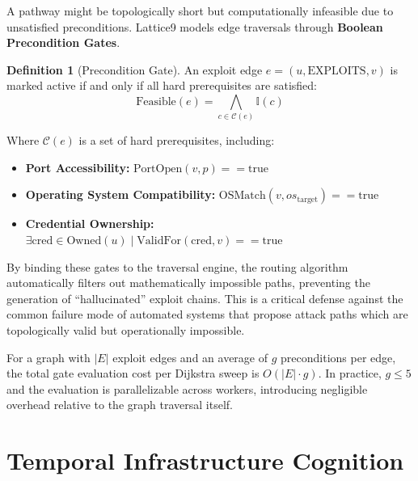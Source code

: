 \documentclass[11pt,a4paper]{article}
\theoremstyle{definition}
\newtheorem{definition}{Definition}[section]
\numberwithin{equation}{section}
\newcommand{\set}[1]{\mathcal{#1}}
\newcommand{\ind}[1]{\mathbb{I}(#1)}
\begin{document}
A pathway might be topologically short but computationally infeasible due to unsatisfied preconditions. Lattice9 models edge traversals through \textbf{Boolean Precondition Gates}.

\begin{definition}[Precondition Gate]
An exploit edge $e = (u, \text{EXPLOITS}, v)$ is marked active if and only if all hard prerequisites are satisfied:
\begin{equation}\label{eq:feasibility}
\text{Feasible}(e) = \bigwedge_{c \in \set{C}(e)} \ind{c}
\end{equation}
\end{definition}

Where $\set{C}(e)$ is a set of hard prerequisites, including:
\begin{itemize}[leftmargin=2em]
    \item \textbf{Port Accessibility:} $\text{PortOpen}(v, p) == \text{true}$
    \item \textbf{Operating System Compatibility:} $\text{OSMatch}(v, os_{\text{target}}) == \text{true}$
    \item \textbf{Credential Ownership:} $\exists \text{cred} \in \text{Owned}(u) \mid \text{ValidFor}(\text{cred}, v) == \text{true}$
\end{itemize}

By binding these gates to the traversal engine, the routing algorithm automatically filters out mathematically impossible paths, preventing the generation of ``hallucinated'' exploit chains. This is a critical defense against the common failure mode of automated systems that propose attack paths which are topologically valid but operationally impossible.

\begin{computationwarning}
For a graph with $|E|$ exploit edges and an average of $g$ preconditions per edge, the total gate evaluation cost per Dijkstra sweep is $O(|E| \cdot g)$. In practice, $g \leq 5$ and the evaluation is parallelizable across workers, introducing negligible overhead relative to the graph traversal itself.
\end{computationwarning}

\section{Temporal Infrastructure Cognition}\label{sec:temporal}
\end{document}
